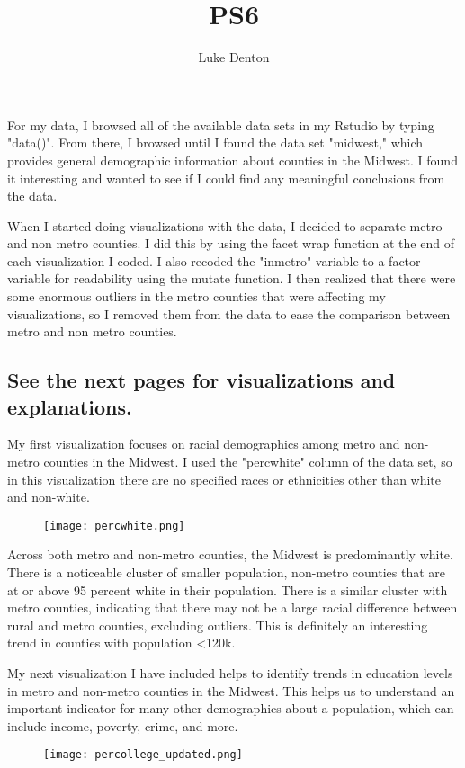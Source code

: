\documentclass{homework}
\title{PS6}
\author{Luke Denton}
\begin{document}
\maketitle

\exercise
For my data, I browsed all of the available data sets in my Rstudio by typing "data()". From there, I browsed until I found the data set "midwest," which provides general demographic information about counties in the Midwest. I found it interesting and wanted to see if I could find any meaningful conclusions from the data.

When I started doing visualizations with the data, I decided to separate metro and non metro counties. I did this by using the facet wrap function at the end of each visualization I coded. I also recoded the "inmetro" variable to a factor variable for readability using the mutate function. I then realized that there were some enormous outliers in the metro counties that were affecting my visualizations, so I removed them from the data to ease the comparison between metro and non metro counties.

\subsection{See the next pages for visualizations and explanations.}

\newpage
\exercise
My first visualization focuses on racial demographics among metro and non-metro counties in the Midwest. I used the "percwhite" column of the data set, so in this visualization there are no specified races or ethnicities other than white and non-white.

\begin{figure}[h]
\texttt{[image: percwhite.png]}
\end{figure}
Across both metro and non-metro counties, the Midwest is predominantly white. There is a noticeable cluster of smaller population, non-metro counties that are at or above 95 percent white in their population. There is a similar cluster with metro counties, indicating that there may not be a large racial difference between rural and metro counties, excluding outliers. This is definitely an interesting trend in counties with population <120k.

\newpage
\exercise*
My next visualization I have included helps to identify trends in education levels in metro and non-metro counties in the Midwest. This helps us to understand an important indicator for many other demographics about a population, which can include income, poverty, crime, and more.
\begin{figure}[h]
\texttt{[image: percollege\_updated.png]}
\end{figure}
\end{document}
